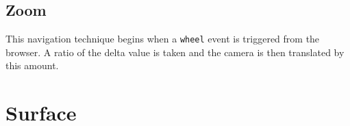 {{		
	
	}

	\subsection{Zoom} {
	\label{sec:zoom}

		This navigation technique begins when a \texttt{wheel} event is triggered from the browser. A ratio of the delta value is taken and the camera is then translated by this amount.
	
	}

}

\section{Surface} {
\label{sec:surface}


	

}

